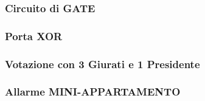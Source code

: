 \subsubsection{Circuito di GATE}

\subsubsection{Porta XOR}

\subsubsection{Votazione con 3 Giurati e 1 Presidente}

\subsubsection{Allarme MINI-APPARTAMENTO}





